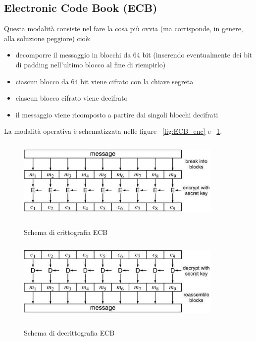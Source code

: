 \subsection{Electronic Code Book (ECB)}
Questa modalità consiste nel fare la cosa più ovvia (ma corrisponde, in genere, alla soluzione peggiore) cioè:
\begin{itemize}
\item decomporre il messaggio in blocchi da 64 bit (inserendo eventualmente dei bit di padding nell'ultimo blocco al fine di riempirlo)
\item ciascun blocco da 64 bit viene cifrato con la chiave segreta
\item ciascun blocco cifrato viene decifrato
\item il messaggio viene ricomposto a partire dai singoli blocchi decifrati
\end{itemize}
La modalità operativa è schematizzata nelle figure ~\ref{fig:ECB_enc} e ~\ref{fig:ECB_dec}.
\begin{figure}[htbp]
	\centering%
	\subfigure%
	{\includegraphics[height=4cm, width=10cm, keepaspectratio]{Immagini/modalita_operative/ECB_enc.png}}
	\caption{Schema di crittografia ECB \label{fig:ECB_enc}} 	
	\subfigure%
	{\includegraphics[height=4cm, width=10cm, keepaspectratio]{Immagini/modalita_operative/ECB_dec.png}}
	\caption{Schema di decrittografia ECB \label{fig:ECB_dec}} 
\end{figure}

